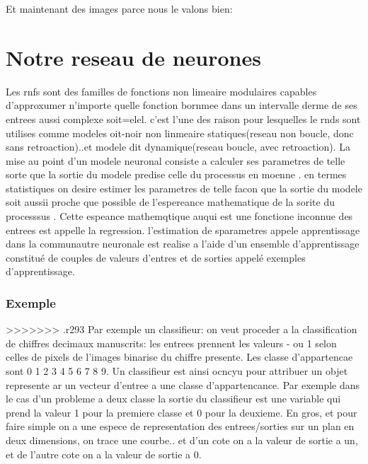 Et maintenant des images parce nous le valons bien:






\chapter{Notre reseau de neurones} %
\label{cha:notre_reseau_de_neurones}
Les rnfs sont des familles de fonctions non limeaire modulaires
capables d'approxumer n'importe quelle fonction bornmee dans un
intervalle derme de ses entrees aussi complexe soit=elel. c'est l'une
des raison pour lesquelles le rnds sont utilises comme modeles
oit-noir non linmeaire statiques(reseau non boucle, donc sans
retroaction)..et modele dit dynamique(reseau boucle, avec
retroaction). La mise au point d'un modele neuronal consiste a
calculer ses parametres de telle sorte que la sortie du modele predise
celle du processus en moenne . en termes statistiques on desire
estimer les parametres de telle facon que la sortie du modele soit
aussii proche que possible de l'espereance mathematique de la sorite
du processsus . Cette espeance mathemqtique auqui est une fonctione
inconnue des entrees est appelle la regression. l'estimation de
sparametres appele apprentissage dans la communautre neuronale est
realise  a l'aide d'un ensemble d'apprentissage constitu\'e de couples
de valeurs d'entres et de sorties appel\'e exemples d'apprentissage.

\subsection{Exemple}
>>>>>>> .r293
Par exemple un classifieur: on veut proceder a la classification de
chiffres decimaux manuscrits: les entrees prennent les valeurs - ou 1
selon celles de pixels de l'images binarise du chiffre presente. Les
classe d'appartencae sont {0 1 2 3 4 5 6 7 8 9}.
Un classifieur est ainsi ocncyu pour attribuer un objet represente ar
un vecteur d'entree a une classe d'appartencance. Par exemple dans le
cas d'un probleme a deux classe la sortie du classifieur est une
variable qui prend la valeur 1 pour la premiere classe et 0 pour la
deuxieme.
En gros, et pour faire simple on a une espece de representation des
entrees/sorties sur un plan en deux dimensions, on trace une
courbe.. et d'un cote on a la valeur de sortie a un, et de l'autre
cote on a la valeur de sortie a 0.

